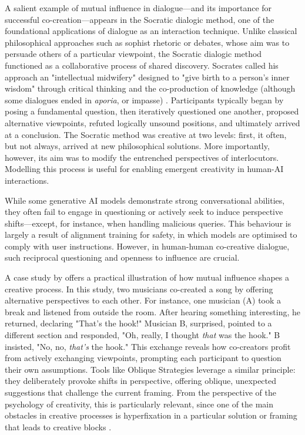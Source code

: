 A salient example of mutual influence in dialogue—and its importance for successful co-creation—appears in the Socratic dialogic method, one of the foundational applications of dialogue as an interaction technique. Unlike classical philosophical approaches such as sophist rhetoric or debates, whose aim was to persuade others of a particular viewpoint, the Socratic dialogic method functioned as a collaborative process of shared discovery. Socrates called his approach an "intellectual midwifery" designed to "give birth to a person's inner wisdom" through critical thinking and the co-production of knowledge (although some dialogues ended in \textit{aporia}, or impasse) \cite{Nails2005-iq, Wikipedia-contributors2024-hr}. Participants typically began by posing a fundamental question, then iteratively questioned one another, proposed alternative viewpoints, refuted logically unsound positions, and ultimately arrived at a conclusion. The Socratic method was creative at two levels: first, it often, but not always, arrived at new philosophical solutions. More importantly, however, its aim was to modify the entrenched perspectives of interlocutors. Modelling this process is useful for enabling emergent creativity in human-AI interactions.

While some generative AI models demonstrate strong conversational abilities, they often fail to engage in questioning or actively seek to induce perspective shifts—except, for instance, when handling malicious queries. This behaviour is largely a result of alignment training for safety, in which models are optimised to comply with user instructions. However, in human-human co-creative dialogue, such reciprocal questioning and openness to influence are crucial.

A case study by \cite{Bown2020-oc} offers a practical illustration of how mutual influence shapes a creative process. In this study, two musicians co-created a song by offering alternative perspectives to each other. For instance, one musician (A) took a break and listened from outside the room. After hearing something interesting, he returned, declaring "That's the hook!" Musician B, surprised, pointed to a different section and responded, "Oh, really, I thought \textit{that} was the hook." B insisted, "No, no, \textit{that's} the hook." This exchange reveals how co-creators profit from actively exchanging viewpoints, prompting each participant to question their own assumptions. Tools like Oblique Strategies leverage a similar principle: they deliberately provoke shifts in perspective, offering oblique, unexpected suggestions that challenge the current framing. From the perspective of the psychology of creativity, this is particularly relevant, since one of the main obstacles in creative processes is hyperfixation in a particular solution or framing that leads to creative blocks \cite{Jansson1991-wy}. 

